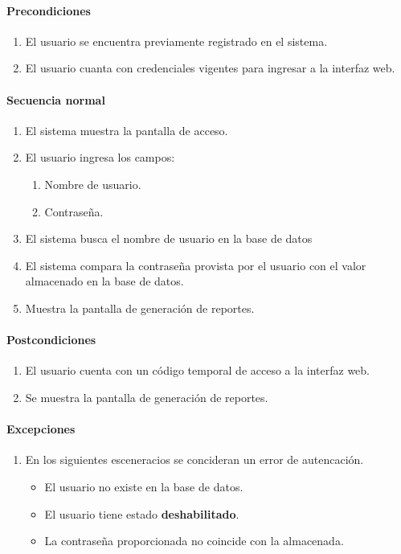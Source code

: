 \paragraph*{Precondiciones}
\begin{enumerate}
  \item El usuario se encuentra previamente registrado en el sistema.
  \item El usuario cuanta con credenciales vigentes para ingresar a la interfaz web.
\end{enumerate}
\paragraph*{Secuencia normal}
\begin{enumerate}
  \item El sistema muestra la pantalla de acceso.
  \item El usuario ingresa los campos:
  \begin{enumerate}
    \item Nombre de usuario.
    \item Contraseña.
  \end{enumerate}
  \item El sistema busca el nombre de usuario en la base de datos
  \item El sistema compara la contraseña provista por el usuario con el valor almacenado en la base de datos.
  \item Muestra la pantalla de generación de reportes.
\end{enumerate}
\paragraph*{Postcondiciones}
\begin{enumerate}
  \item El usuario cuenta con un código temporal de acceso a la interfaz web.
  \item Se muestra la pantalla de generación de reportes.
\end{enumerate}
\paragraph*{Excepciones}
\begin{enumerate}
  \item En los siguientes esceneracios se concideran un error de autencación.
  \begin{itemize}
    \item El usuario no existe en la base de datos.
    \item El usuario tiene estado \textbf{deshabilitado}.
    \item La contraseña proporcionada no coincide con la almacenada. 
  \end{itemize}
\end{enumerate}

